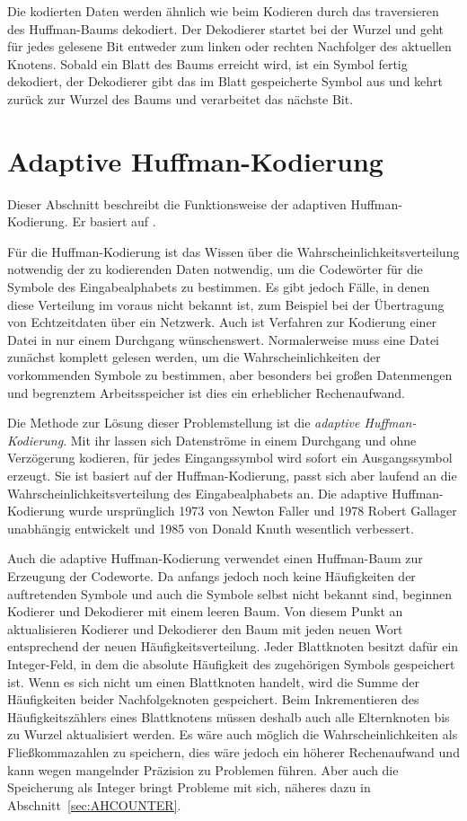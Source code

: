 \documentclass[twoside,11pt,a4paper]{article}
\theoremstyle{break}
\begin{document}
Die kodierten Daten werden ähnlich wie beim Kodieren durch das
traversieren des Huffman-Baums dekodiert. Der Dekodierer startet bei
der Wurzel und geht für jedes gelesene Bit entweder zum linken oder
rechten Nachfolger des aktuellen Knotens. Sobald ein Blatt des Baums
erreicht wird, ist ein Symbol fertig dekodiert, der Dekodierer gibt
das im Blatt gespeicherte Symbol aus und kehrt zurück zur Wurzel des
Baums und verarbeitet das nächste Bit.

\section{Adaptive Huffman-Kodierung}
Dieser Abschnitt beschreibt die Funktionsweise der adaptiven Huffman-Kodierung. Er basiert auf \cite[S. 234 --
 S. 238]{Salomon:2010}.

Für die Huffman-Kodierung ist das Wissen über die
Wahrscheinlichkeitsverteilung notwendig der zu kodierenden Daten
notwendig, um die Codewörter für die Symbole des Eingabealphabets zu
bestimmen. Es gibt jedoch Fälle, in denen diese Verteilung im voraus
nicht bekannt ist, zum Beispiel bei der Übertragung von Echtzeitdaten
über ein Netzwerk. Auch ist Verfahren zur Kodierung einer Datei in nur
einem Durchgang wünschenswert. Normalerweise muss eine Datei zunächst
komplett gelesen werden, um die Wahrscheinlichkeiten der vorkommenden
Symbole zu bestimmen, aber besonders bei großen Datenmengen und
begrenztem Arbeitsspeicher ist dies ein erheblicher Rechenaufwand.

Die Methode zur Lösung dieser Problemstellung ist die \emph{adaptive
  Huffman-Kodierung}. Mit ihr lassen sich Datenströme in einem
Durchgang und ohne Verzögerung kodieren, für jedes Eingangssymbol wird
sofort ein Ausgangssymbol erzeugt. Sie ist basiert auf der
Huffman-Kodierung, passt sich aber laufend an die
Wahrscheinlichkeitsverteilung des Eingabealphabets an. Die adaptive
Huffman-Kodierung wurde ursprünglich 1973 von Newton Faller und 1978
Robert Gallager unabhängig entwickelt und 1985 von Donald Knuth
wesentlich verbessert.

Auch die adaptive Huffman-Kodierung verwendet einen Huffman-Baum zur
Erzeugung der Codeworte. Da anfangs jedoch noch keine Häufigkeiten der
auftretenden Symbole und auch die Symbole selbst nicht bekannt sind,
beginnen Kodierer und Dekodierer mit einem leeren Baum. Von diesem
Punkt an aktualisieren Kodierer und Dekodierer den Baum mit jeden
neuen Wort entsprechend der neuen Häufigkeitsverteilung. Jeder
Blattknoten besitzt dafür ein Integer-Feld, in dem die absolute
Häufigkeit des zugehörigen Symbols gespeichert ist. Wenn es sich nicht
um einen Blattknoten handelt, wird die Summe der Häufigkeiten beider
Nachfolgeknoten gespeichert. Beim Inkrementieren des
Häufigkeitszählers eines Blattknotens müssen deshalb auch alle
Elternknoten bis zu Wurzel aktualisiert werden. Es wäre auch
möglich die Wahrscheinlichkeiten als Fließkommazahlen zu speichern,
dies wäre jedoch ein höherer Rechenaufwand und kann wegen mangelnder
Präzision zu Problemen führen. Aber auch die Speicherung als Integer bringt
Probleme mit sich, näheres dazu in Abschnitt~\ref{sec:AHCOUNTER}.
\end{document}
